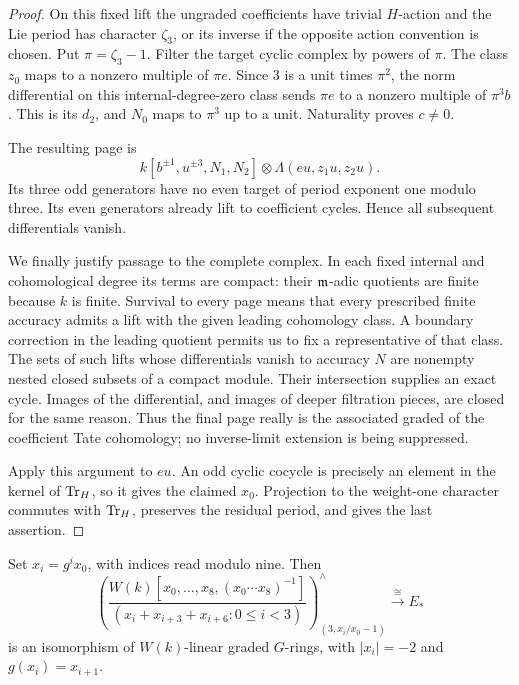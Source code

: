 \begin{proof}
On this fixed lift the ungraded coefficients have trivial \(H\)-action
and the Lie period has character \(\zeta_3\), or its inverse if the
opposite action convention is chosen.  Put \(\pi=\zeta_3-1\).
Filter the target cyclic complex by powers of \(\pi\).
The class \(z_0\) maps to a nonzero multiple of \(\pi e\).
Since \(3\) is a unit times \(\pi^2\), the norm differential on this
internal-degree-zero class sends \(\pi e\) to a nonzero multiple of
\(\pi^3b\).  This is its \(d_2\), and \(N_0\) maps to \(\pi^3\)
up to a unit.  Naturality proves \(c\ne0\).

The resulting page is
\begin{equation}\label{coef:final-graded}
 k[b^{\pm1},u^{\pm3},N_1,N_2]
       \otimes\Lambda(eu,z_1u,z_2u).
\end{equation}
Its three odd generators have no even target of period exponent one
modulo three.  Its even generators already lift to coefficient
cycles.  Hence all subsequent differentials vanish.

We finally justify passage to the complete complex.  In each fixed
internal and cohomological degree its terms are compact: their
\(\mathfrak m\)-adic quotients are finite because \(k\) is finite.
Survival to every page means that every prescribed finite accuracy
admits a lift with the given leading cohomology class.  A boundary
correction in the leading quotient permits us to fix a representative
of that class.  The sets of such lifts whose differentials vanish to
accuracy \(N\) are nonempty nested closed subsets of a compact module.
Their intersection supplies an exact cycle.  Images of the
differential, and images of deeper filtration pieces, are closed for
the same reason.  Thus the final page really is the associated
graded of the coefficient Tate cohomology; no inverse-limit
extension is being suppressed.

Apply this argument to \(eu\).  An odd cyclic cocycle is precisely an
element in the kernel of \(\operatorname{Tr}_H\), so it gives the claimed \(x_0\).
Projection to the weight-one character commutes with \(\operatorname{Tr}_H\),
preserves the residual period, and gives the last assertion.
\end{proof}

\begin{theorem}\label{coef:model}
Set \(x_i=g^i x_0\), with indices read modulo nine.  Then
\begin{equation}\label{coef:ring-model}
 \left(
 \frac{W(k)[x_0,\ldots,x_8,(x_0\cdots x_8)^{-1}]}
 {(x_i+x_{i+3}+x_{i+6}:0\le i<3)}
 \right)^{\wedge}_{(3,x_i/x_0-1)}
 \xrightarrow{\ \cong\ } E_*
\end{equation}
is an isomorphism of \(W(k)\)-linear graded \(G\)-rings, with
\(|x_i|=-2\) and \(g(x_i)=x_{i+1}\).
\end{theorem}

